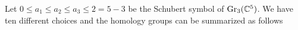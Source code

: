 \documentclass[letterpaper, 12pt]{article}
\begin{document}
\begin{solution}
Let \(0\leq a_1\leq a_2\leq a_3\leq 2=5-3\) be the Schubert symbol of \(\text{Gr}_3(\mathbb{C}^5)\). We have ten different choices and the homology groups can be summarized as follows
\begin{table}[ht]
    \centering
    \end{table}


\end{solution}
\end{document}
